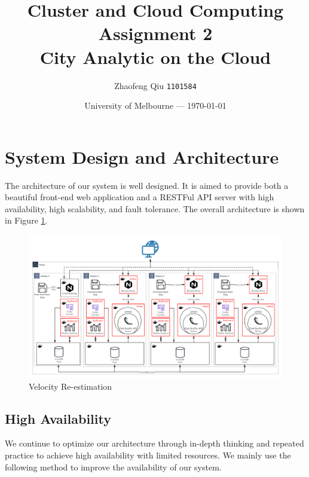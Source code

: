 \documentclass{article}
\title{Cluster and Cloud Computing Assignment 2
		\\ City Analytic on the Cloud} %
\author{ Zhaofeng Qiu \texttt{1101584}} %
\date{University of Melbourne --- \today} %
\begin{document}
\maketitle %


\section{System Design and Architecture}
The architecture of our system is well designed. It is aimed to provide both a beautiful front-end web application and a RESTFul API server with high availability, high scalability, and fault tolerance. The overall architecture is shown in Figure \ref{fig:systemArchitecturePsystemArchitecture}. 

\begin{figure}[htp]
\centering
\includegraphics[width=\textwidth]{img/systemStructure.png}
\caption{Velocity Re-estimation}
\label{fig:systemArchitecturePsystemArchitecture}
\end{figure}

\subsection{High Availability}
We continue to optimize our architecture through in-depth thinking and repeated practice to achieve high availability with limited resources. We mainly use the following method to improve the availability of our system.
\end{document}
